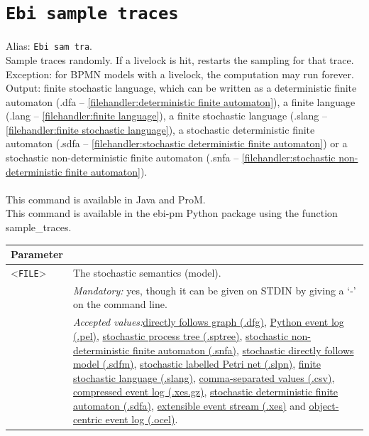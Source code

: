 {\clearpage\section{\texttt{Ebi sample traces}}
\label{command:Ebi sample traces}
Alias: \texttt{Ebi sam tra}.\\
Sample traces randomly.
        If a livelock is hit, restarts the sampling for that trace. Exception: for BPMN models with a livelock, the computation may run forever.\\
\noindent Output: finite stochastic language, which can be written as a deterministic finite automaton (.dfa -- \cref{filehandler:deterministic finite automaton}), a finite language (.lang -- \cref{filehandler:finite language}), a finite stochastic language (.slang -- \cref{filehandler:finite stochastic language}), a stochastic deterministic finite automaton (.sdfa -- \cref{filehandler:stochastic deterministic finite automaton}) or a stochastic non-deterministic finite automaton (.snfa -- \cref{filehandler:stochastic non-deterministic finite automaton}).\\
\\This command is available in Java and ProM.
\\This command is available in the ebi-pm Python package using the function sample\_traces.
\begin{tabularx}{\linewidth}{lX}
\toprule
Parameter \\\midrule
<\texttt{FILE}>&The stochastic semantics (model).\\
&\textit{Mandatory:} \quad yes, though it can be given on STDIN by giving a `-' on the command line.\\
&\textit{Accepted values:}\quad \hyperref[filehandler:directly follows graph]{directly follows graph (.dfg)}, \hyperref[filehandler:Python event log]{Python event log (.pel)}, \hyperref[filehandler:stochastic process tree]{stochastic process tree (.sptree)}, \hyperref[filehandler:stochastic non-deterministic finite automaton]{stochastic non-deterministic finite automaton (.snfa)}, \hyperref[filehandler:stochastic directly follows model]{stochastic directly follows model (.sdfm)}, \hyperref[filehandler:stochastic labelled Petri net]{stochastic labelled Petri net (.slpn)}, \hyperref[filehandler:finite stochastic language]{finite stochastic language (.slang)}, \hyperref[filehandler:comma-separated values]{comma-separated values (.csv)}, \hyperref[filehandler:compressed event log]{compressed event log (.xes.gz)}, \hyperref[filehandler:stochastic deterministic finite automaton]{stochastic deterministic finite automaton (.sdfa)}, \hyperref[filehandler:extensible event stream]{extensible event stream (.xes)} and \hyperref[filehandler:object-centric event log]{object-centric event log (.ocel)}.\\

\end{tabularx}}
